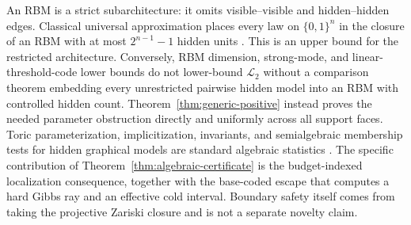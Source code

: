 \documentclass{article}
\newcommand{\LC}{\mathcal{L}}
\newcommand{\bits}{\{0,1\}}
\begin{document}
An RBM is a strict subarchitecture: it omits visible--visible and
hidden--hidden edges.  Classical universal approximation places every law on
$\bits^n$ in the closure of an RBM with at most $2^{n-1}-1$ hidden units
\cite[Theorem~1]{montufaray11}.  This is an upper bound for the restricted
architecture.  Conversely, RBM dimension, strong-mode, and
linear-threshold-code lower bounds do not lower-bound $\LC_2$ without a
comparison theorem embedding every unrestricted pairwise hidden model into an
RBM with controlled hidden count.  Theorem~\ref{thm:generic-positive} instead proves the needed parameter
obstruction directly and uniformly across all support faces.  Toric
parameterization, implicitization, invariants, and semialgebraic membership
tests for hidden graphical models are standard algebraic statistics
\cite{geiger06,cuetomortonsturmfels10,critch13,seigalmontufar18}.  The specific
contribution of Theorem~\ref{thm:algebraic-certificate} is the budget-indexed
localization consequence, together with the base-coded escape that computes a
hard Gibbs ray and an effective cold interval.  Boundary safety itself comes
from taking the projective Zariski closure and is not a separate novelty claim.
\end{document}
